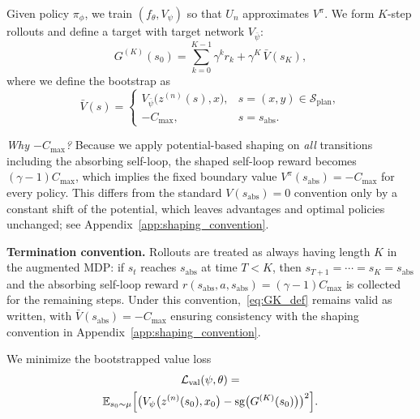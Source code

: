 \documentclass{article}
\theoremstyle{plain}
\theoremstyle{definition}
\theoremstyle{remark}
\newcommand{\E}{\mathbb{E}}
\newcommand{\SSS}{\mathcal{S}}
\newcommand{\sg}{\operatorname{sg}}
\begin{document}
{Given policy $\pi_\phi$, we train $(f_\theta,V_\psi)$ so that $U_n$ approximates $V^\pi$.
We form $K$-step rollouts and define a target with target network $V_{\bar\psi}$:
\begin{equation}
G^{(K)}(s_0)
=
\sum_{k=0}^{K-1}\gamma^k r_k
+
\gamma^K \, \bar V(s_K),
\label{eq:GK_def}
\end{equation}
where we define the bootstrap as
\[
\bar V(s)
=
\begin{cases}
V_{\bar\psi}\bigl(z^{(n)}(s),x\bigr), & s=(x,y)\in\SSS_{\mathrm{plan}},\\
-C_{\max}, & s=s_{\mathrm{abs}}.
\end{cases}
\]

\emph{Why $-C_{\max}$?}
Because we apply potential-based shaping on \emph{all} transitions including the absorbing self-loop, the shaped self-loop reward becomes $(\gamma-1)C_{\max}$, which implies the fixed boundary value $V^\pi(s_{\mathrm{abs}})=-C_{\max}$ for every policy.
This differs from the standard $V(s_{\mathrm{abs}})=0$ convention only by a constant shift of the potential, which leaves advantages and optimal policies unchanged; see Appendix~\ref{app:shaping_convention}.


\textbf{Termination convention.}
Rollouts are treated as always having length $K$ in the augmented MDP: if $s_t$ reaches $s_{\mathrm{abs}}$ at time $T < K$, then $s_{T+1}=\cdots=s_K=s_{\mathrm{abs}}$ and the absorbing self-loop reward $r(s_{\mathrm{abs}},a,s_{\mathrm{abs}})=(\gamma-1)C_{\max}$ is collected for the remaining steps.
Under this convention,~\eqref{eq:GK_def} remains valid as written, with $\bar V(s_{\mathrm{abs}})=-C_{\max}$ ensuring consistency with the shaping convention in Appendix~\ref{app:shaping_convention}.

We minimize the bootstrapped value loss
\begin{multline}
\mathcal{L}_{\mathrm{val}}(\psi,\theta)
=\\
\E_{s_0\sim\mu}\Bigl[
   \bigl(V_\psi\bigl(z^{(n)}(s_0),x_0\bigr)
   -
   \sg\bigl(G^{(K)}(s_0)\bigr)\bigr)^2
\Bigr].
\label{eq:KBR_loss}
\end{multline}}
\end{document}
